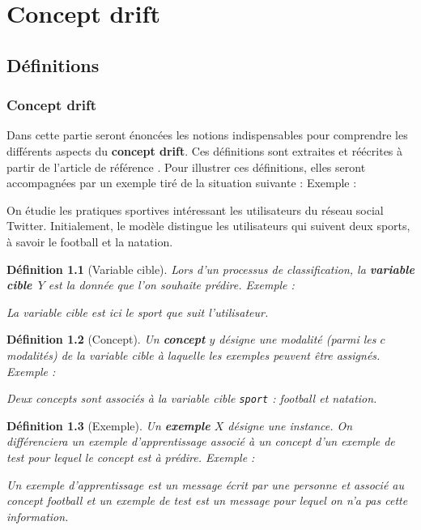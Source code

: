 \documentclass[utf8]{stageM2R} %
\newtheorem{mydef}{Définition}
\theoremstyle{remark}
\renewcommand{\emph}{\textbf}
\newenvironment{exemple}{%
\upshape Exemple :%
    \small     %
}{%
}
\begin{document}

\chapter{Concept drift} \label{ConceptDrift}
\section{Définitions}
\label{definitions}
\subsection{Concept drift}
Dans cette partie seront énoncées les notions indispensables pour comprendre les différents aspects du \emph{concept drift}. Ces définitions sont extraites et réécrites à partir de l'article de référence \cite{Gama2014}. Pour illustrer ces définitions, elles seront accompagnées par un exemple tiré de la situation suivante :
\begin{exemple}
On étudie les pratiques sportives intéressant les utilisateurs du réseau social Twitter. Initialement, le modèle distingue les utilisateurs qui suivent deux sports, à savoir le football et la natation.
\end{exemple}


\begin{mydef}[Variable cible]
Lors d'un processus de classification, la \emph{variable cible}~$Y$ est la donnée que l'on souhaite prédire. 
\begin{exemple}
La variable cible est ici le sport que suit l'utilisateur.
\end{exemple}
\end{mydef}

\begin{mydef}[Concept]
Un \emph{concept} $y$ désigne une modalité (parmi les $c$ modalités) de la variable cible à laquelle les exemples peuvent être assignés. 
\begin{exemple}
Deux concepts sont associés à la variable cible \texttt{sport} : football et natation.
\end{exemple}
\end{mydef}


\begin{mydef}[Exemple]
Un \emph{exemple} $X$ désigne une instance. On différenciera un exemple d'apprentissage associé à un concept d'un exemple de test pour lequel le concept est à prédire.
\begin{exemple}
Un exemple d'apprentissage est un message écrit par une personne et associé au concept football et un exemple de test est un message pour lequel on n'a pas cette information.
\end{exemple}
\end{mydef}
\end{document}
